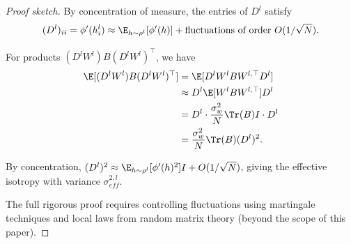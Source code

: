 \begin{proof}[Proof sketch]
By concentration of measure, the entries of $D^l$ satisfy
\[
(D^l)_{ii} = \phi'(h^l_i) \approx \E_{h \sim \rho^l}[\phi'(h)] + \text{fluctuations of order } O(1/\sqrt{N}).
\]

For products $(D^l W^l) B (D^l W^l)^\top$, we have
\begin{align}
\E[(D^l W^l) B (D^l W^l)^\top]
&= \E[D^l W^l B W^{l,\top} D^l] \\
&\approx D^l \E[W^l B W^{l,\top}] D^l \\
&= D^l \cdot \frac{\sigma_w^2}{N}\Tr(B) I \cdot D^l \\
&= \frac{\sigma_w^2}{N}\Tr(B) (D^l)^2.
\end{align}

By concentration, $(D^l)^2 \approx \E_{h \sim \rho^l}[\phi'(h)^2] I + O(1/\sqrt{N})$, giving the effective isotropy with variance $\sigma_{eff}^{2,l}$.

The full rigorous proof requires controlling fluctuations using martingale techniques and local laws from random matrix theory (beyond the scope of this paper).
\end{proof}
